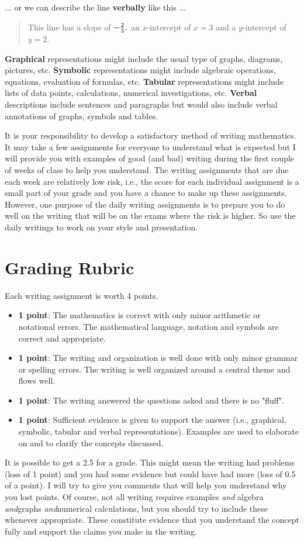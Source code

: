 $\ldots$ or we can describe the line {\bf{verbally}} like this $\ldots$
 \begin{quote}{This line has a slope of $ - {2 \over 3},$ an $x$-intercept of $x = 3$ and a $y$-intercept of $y = 2$.}\end{quote}

{\bf{Graphical}} representations might include the usual type of graphs, diagrams, pictures, etc.  {\bf{Symbolic}} representations might include algebraic operations, equations, evaluation of formulas, etc.  {\bf{Tabular}} representations might include lists of data points, calculations, numerical investigations, etc.  {\bf{Verbal}} descriptions include sentences and paragraphs but would also include verbal annotations of graphs, symbols and tables.

 It is your responsibility to develop a satisfactory method of writing mathematics.  It may take a few assignments for everyone to understand what is expected but I will provide you with examples of good (and bad) writing during the first couple of weeks of class to help you understand.  The writing assignments that are due each week are relatively low risk, i.e., the score for each individual assignment is a small part of your grade and you have a chance to make up these assignments.  However, one purpose of the daily writing assignments is to prepare you to do well on the writing that will be on the exams where the risk is higher.  So use the daily writings to work on your style and presentation.
 
	\section{Grading Rubric}
	 
Each writing assignment is worth 4 points.
\begin{itemize}
\item {\bf{1 point}}:  The mathematics is correct with only minor arithmetic or notational errors.  The mathematical language, notation and symbols are correct and appropriate.
\item  {\bf{1 point}}:  The writing and organization is well done with only minor grammar or spelling errors.  The writing is well organized around a central theme and flows well.  
\item  {\bf{1 point}}:  The writing answered the questions asked and there is no "fluff".
\item  {\bf{1 point}}:  Sufficient evidence is given to support the answer (i.e., graphical, symbolic, tabular and verbal representations).  Examples are used to elaborate on and to clarify the concepts discussed.  
\end{itemize}
 It is possible to get a 2.5 for a grade.  This might mean the writing had problems (loss of 1 point) and you had some evidence but could have had more (loss of 0.5 of a point).  I will try to give you comments that will help you understand why you lost points.  Of course, not all writing requires examples \emph{and} algebra \emph{and}graphs \emph{and}numerical calculations, but you should try to include these whenever appropriate.  These constitute evidence that you understand the concept fully and support the claims you make in the writing.

